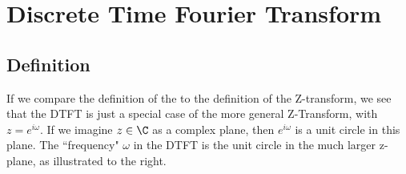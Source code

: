 \chapter{Discrete Time Fourier Transform}
\section{Definition}
\begin{definition}
\label{def:dtft}
\end{definition}

\begin{minipage}{\tw-35mm}
If we compare the definition of the   
to the definition of the Z-transform,
we see that the DTFT is just a special case of the more general Z-Transform, with $z = e^{i\omega}$.
If we imagine $z\in\C$ as a complex plane, then $e^{i\omega}$ is 
a unit circle in this plane.
The ``frequency" $\omega$ in the DTFT is the unit circle in the much larger z-plane,
as illustrated to the right.
\end{minipage}%
\hfill{}


